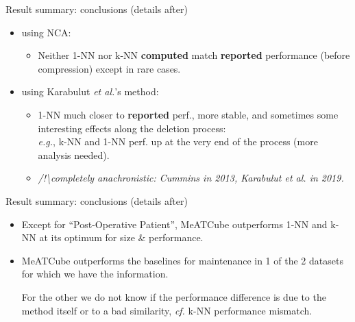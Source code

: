\documentclass[]{beamer}
\begin{document}
\begin{frame}{Result summary: conclusions (details after)}
    \begin{itemize}
        \item using NCA: \begin{itemize}
            \item Neither 1-NN nor k-NN \textbf{computed} match \textbf{reported} performance (before compression) except in rare cases.
        \end{itemize}
         
        \item using Karabulut \textit{et al.}'s method:\begin{itemize}
            \item 1-NN much closer to \textbf{reported} perf., more stable, and sometimes some interesting effects along the deletion process:\\
            \textit{e.g.}, k-NN and 1-NN perf. up at the very end of the process (more analysis needed).
            \item \textit{/!\textbackslash completely anachronistic: Cummins in 2013, Karabulut \textit{et al.} in 2019.}
        \end{itemize}
    \end{itemize}
\end{frame}
\begin{frame}{Result summary: conclusions (details after)}
    \begin{itemize}
        \item Except for ``Post-Operative Patient'', MeATCube outperforms 1-NN and k-NN at its optimum for size \& performance.
        \item MeATCube outperforms the baselines for maintenance in 1 of the 2 datasets for which we have the information.
        
        For the other we do not know if the performance difference is due to the method itself or to a bad similarity, \textit{cf.} k-NN performance mismatch.
    \end{itemize}
\end{frame}
\end{document}
